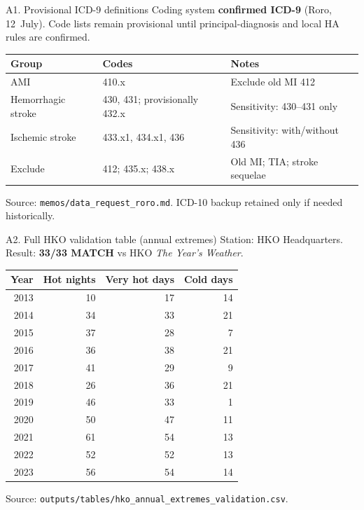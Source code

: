 \documentclass[aspectratio=169,10pt]{beamer}
\begin{document}
\begin{frame}{A1. Provisional ICD-9 definitions}
  \footnotesize
  Coding system \textbf{confirmed ICD-9} (Roro, 12~July). Code lists remain provisional until principal-diagnosis and local HA rules are confirmed.

  \vspace{0.4em}
  \begin{tabular}{@{}llp{5.8cm}@{}}
    \toprule
    Group & Codes & Notes \\
    \midrule
    AMI & 410.x & Exclude old MI 412 \\
    Hemorrhagic stroke & 430, 431; provisionally 432.x & Sensitivity: 430--431 only \\
    Ischemic stroke & 433.x1, 434.x1, 436 & Sensitivity: with/without 436 \\
    Exclude & 412; 435.x; 438.x & Old MI; TIA; stroke sequelae \\
    \bottomrule
  \end{tabular}

  \vspace{0.5em}
  Source: \texttt{memos/data\_request\_roro.md}. ICD-10 backup retained only if needed historically.
\end{frame}

\begin{frame}{A2. Full HKO validation table (annual extremes)}
  \scriptsize
  Station: HKO Headquarters. Result: \textbf{33/33 MATCH} vs HKO \textit{The Year's Weather}.

  \vspace{0.3em}
  \begin{tabular}{@{}rrrr@{}}
    \toprule
    Year & Hot nights & Very hot days & Cold days \\
    \midrule
    2013 & 10 & 17 & 14 \\
    2014 & 34 & 33 & 21 \\
    2015 & 37 & 28 & 7 \\
    2016 & 36 & 38 & 21 \\
    2017 & 41 & 29 & 9 \\
    2018 & 26 & 36 & 21 \\
    2019 & 46 & 33 & 1 \\
    2020 & 50 & 47 & 11 \\
    2021 & 61 & 54 & 13 \\
    2022 & 52 & 52 & 13 \\
    2023 & 56 & 54 & 14 \\
    \bottomrule
  \end{tabular}

  \vspace{0.35em}
  Source: \texttt{outputs/tables/hko\_annual\_extremes\_validation.csv}.
\end{frame}
\end{document}
